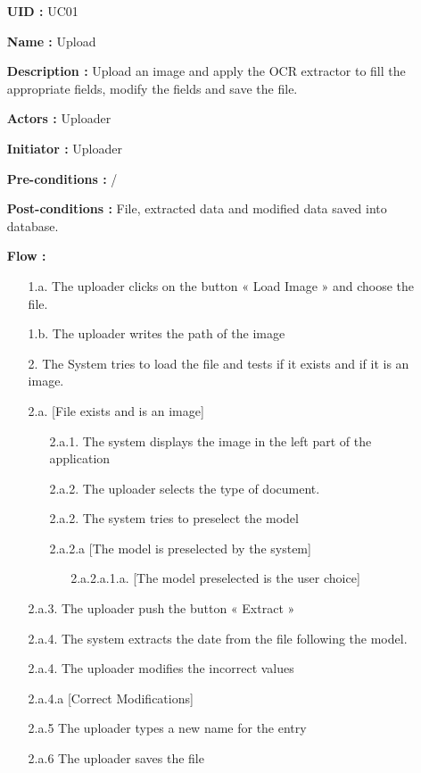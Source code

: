 \begin{enumerate}
	\item[{\bf UID :}] UC01
	\item[{\bf Name :}] Upload
	\item[{\bf Description :}]  Upload an image and apply the OCR extractor to fill the appropriate fields, modify the fields and save the file. 
	\item[{\bf Actors :}] Uploader
	\item[{\bf Initiator :}] Uploader
	\item[{\bf Pre-conditions :}]  /
	\item[{\bf Post-conditions :}]  File, extracted data and modified data saved into database. 
	\item[{\bf Flow :}]
	\begin{itemize}
		\item[{1.a.}] The uploader clicks on the button « Load Image » and choose the file.
		\item[{1.b.}] The uploader writes the path of the image
		\item[{2.}] The System tries to load the file and tests if it exists and if it is an image.
		\item[{2.a.}] [File exists and is an image]
		\begin{itemize}
			\item[{2.a.1.}] The system displays the image in the left part of the application
			\item[{2.a.2.}] The uploader selects the type of document.
			\item[{2.a.2.}] The system tries to preselect the model
			\item[{2.a.2.a}] [The model is preselected by the system]
			\begin{itemize}
				\item[{2.a.2.a.1.a.}] [The model preselected is the user choice]
			\end{itemize}
		\end{itemize}
		\item[{2.a.3.}] The uploader push the button « Extract »
		\item[{2.a.4.}] The system extracts the date from the file following the model.
		\item[{2.a.4.}] The uploader modifies the incorrect values
		\item[{2.a.4.a}] [Correct Modifications]
		\item[{2.a.5}] The uploader types a new name for the entry
		\item[{2.a.6}] The uploader saves the file

\end{itemize}
\end{enumerate}
